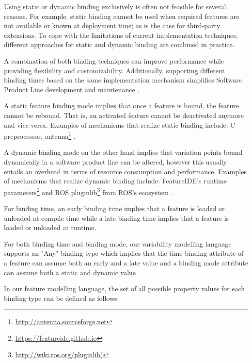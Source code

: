 \documentclass[conference]{IEEEtran}
\newcommand{\foot}[1]{\footnote{\url{#1}}}
\begin{document}
Using static or dynamic binding exclusively is often not feasible for several reasons. For example, static binding cannot be used when required features are not available or known at deployment time; as is the case for third-party extensions. To cope with the limitations of current implementation techniques, different approaches for static and dynamic binding are combined in practice.

A combination of both binding techniques can improve performance while providing flexibility and customizability. Additionally, supporting different binding times based on the same implementation mechanism simplifies Software Product Line development and maintenance \cite{flex-feat-bind}.

A static feature binding mode implies that once a feature is bound, the feature cannot be rebound. That is, an activated feature cannot be deactivated anymore and vice versa. Examples of mechanisms that realize static binding include: C preprocessor, antenna\foot{http://antenna.sourceforge.net} \cite{flex-feat-bind}.

A dynamic binding mode on the other hand implies that variation points bound dynamically in a software product line can be altered, however this usually entails an overhead in terms of resource consumption and performance. Examples of mechanisms that realize dynamic binding include: FeatureIDE's runtime parameters\foot{https://featureide.github.io} and ROS pluginlib\foot{http://wiki.ros.org/pluginlib)} from ROS's ecosystem \cite{flex-feat-bind}.

For binding time, an early binding time implies that a feature is loaded or unloaded at compile time while a late binding time implies that a feature is loaded or unloaded at runtime.

For both binding time and binding mode, our variability modelling language supports an "Any" binding type which implies that the time binding attribute of a feature can assume both an early and a late value and a binding mode attribute can assume both a static and dynamic value

In our feature modelling language, the set of all possible property values for each binding type can be defined as follows:
\end{document}
